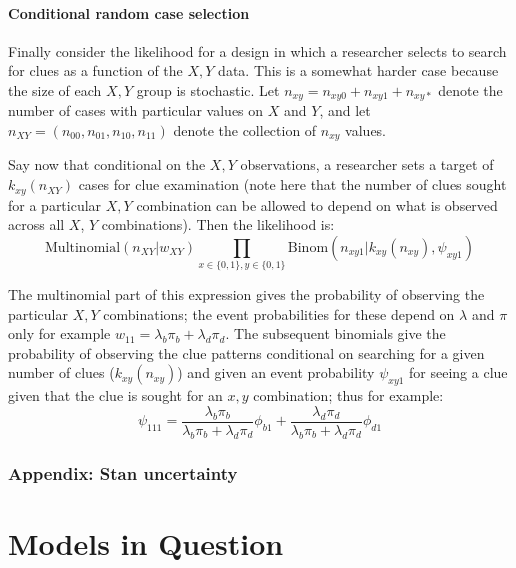 \documentclass[12pt,]{book}
\begin{document}
\hypertarget{conditional-random-case-selection}{%
\subsection{Conditional random case selection}\label{conditional-random-case-selection}}

Finally consider the likelihood for a design in which a researcher selects to search for clues as a function of the \(X,Y\) data. This is a somewhat harder case because the size of each \(X,Y\) group is stochastic. Let \(n_{xy} = n_{xy0}+n_{xy1}+n_{xy*}\) denote the number of cases with particular values on \(X\) and \(Y\), and let \(n_{XY}=(n_{00},n_{01},n_{10},n_{11})\) denote the collection of \(n_{xy}\) values.

Say now that conditional on the \(X,Y\) observations, a researcher sets a target of \(k_{xy}(n_{XY})\) cases for clue examination (note here that the number of clues sought for a particular \(X,Y\) combination can be allowed to depend on what is observed across all \(X\), \(Y\) combinations). Then the likelihood is:
\[\text{Multinomial}(n_{XY}|w_{XY})\prod_{x\in\{0,1\},y \in\{0,1\}}\text{Binom}(n_{xy1}|k_{xy}(n_{xy}), \psi_{xy1})\]

The multinomial part of this expression gives the probability of observing the particular \(X,Y\) combinations; the event probabilities for these depend on \(\lambda\) and \(\pi\) only \textbar{} for example \(w_{11} = \lambda_b \pi_b+\lambda_d \pi_d\). The subsequent binomials give the probability of observing the clue patterns conditional on searching for a given number of clues (\(k_{xy}(n_{xy})\)) and given an event probability \(\psi_{xy1}\) for seeing a clue given that the clue is sought for an \(x,y\) combination; thus for example:
\[ \psi_{111} = \frac{\lambda_b \pi_b}{\lambda_b \pi_b+\lambda_d \pi_d} \phi_{b1} + \frac{\lambda_d \pi_d}{\lambda_b \pi_b+\lambda_d \pi_d} \phi_{d1}\]

\hypertarget{appendix-stan-uncertainty}{%
\section{Appendix: Stan uncertainty}\label{appendix-stan-uncertainty}}

\hypertarget{part-models-in-question}{%
\part{Models in Question}\label{part-models-in-question}}
\end{document}
